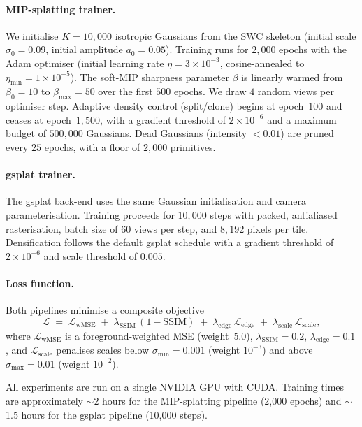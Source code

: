\paragraph{MIP-splatting trainer.}
We initialise $K=10{,}000$ isotropic Gaussians from the SWC skeleton
(initial scale $\sigma_0=0.09$, initial amplitude $a_0=0.05$).
Training runs for $2{,}000$ epochs with the Adam optimiser (initial
learning rate $\eta=3\times10^{-3}$, cosine-annealed to
$\eta_{\min}=1\times10^{-5}$).
The soft-MIP sharpness parameter $\beta$ is linearly warmed from
$\beta_0=10$ to $\beta_{\max}=50$ over the first $500$ epochs.
We draw $4$ random views per optimiser step.
Adaptive density control (split/clone) begins at epoch~$100$ and
ceases at epoch~$1{,}500$, with a gradient threshold of
$2\times10^{-6}$ and a maximum budget of $500{,}000$ Gaussians.
Dead Gaussians (intensity $<0.01$) are pruned every $25$ epochs, with
a floor of $2{,}000$ primitives.

\paragraph{gsplat trainer.}
The gsplat back-end uses the same Gaussian initialisation and camera
parameterisation.
Training proceeds for $10{,}000$ steps with packed, antialiased
rasterisation, batch size of $60$ views per step, and $8{,}192$ pixels
per tile.
Densification follows the default gsplat schedule with a gradient
threshold of $2\times10^{-6}$ and scale threshold of $0.005$.

\paragraph{Loss function.}
Both pipelines minimise a composite objective
\begin{equation}
  \mathcal{L}
  \;=\;
  \mathcal{L}_{\text{wMSE}}
  \;+\;
  \lambda_{\text{SSIM}}\,(1 - \text{SSIM})
  \;+\;
  \lambda_{\text{edge}}\,\mathcal{L}_{\text{edge}}
  \;+\;
  \lambda_{\text{scale}}\,\mathcal{L}_{\text{scale}},
  \label{eq:total-loss}
\end{equation}
where $\mathcal{L}_{\text{wMSE}}$ is a foreground-weighted MSE
(weight~$5.0$),
$\lambda_{\text{SSIM}}=0.2$,
$\lambda_{\text{edge}}=0.1$, and
$\mathcal{L}_{\text{scale}}$ penalises scales below
$\sigma_{\min}=0.001$ (weight $10^{-3}$) and above
$\sigma_{\max}=0.01$ (weight $10^{-2}$).

All experiments are run on a single NVIDIA GPU with CUDA.
Training times are approximately $\sim$2 hours for the MIP-splatting
pipeline (2{,}000 epochs) and $\sim$1.5 hours for the gsplat pipeline
(10{,}000 steps).

